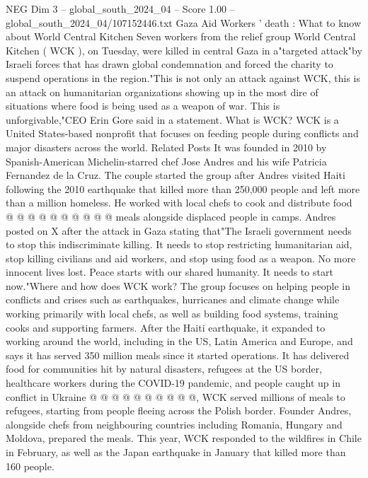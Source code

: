 \begin{textsample}{NEG Dim 3 – global\_south\_2024\_04 – Score 1.00 – global\_south\_2024\_04/107152446.txt}  \label{ex:f3_neg_266}
Gaza Aid Workers ' death : What to know about World Central Kitchen Seven workers from the relief group World Central Kitchen ( WCK ), on Tuesday, were killed in central Gaza in a"targeted attack"by Israeli forces that has drawn global condemnation and forced the charity to suspend operations in the region."This is not only an attack against WCK, this is an attack on humanitarian organizations showing up in the most dire of situations where food is being used as a weapon of war.
This is unforgivable,"CEO Erin Gore said in a statement.
What is WCK?
WCK is a United States-based nonprofit that focuses on feeding people during conflicts and major disasters across the world.
Related Posts It was founded in 2010 by Spanish-American Michelin-starred chef Jose Andres and his wife Patricia Fernandez de la Cruz.
The couple started the group after Andres visited Haiti following the 2010 earthquake that killed more than 250,000 people and left more than a million homeless.
He worked with local chefs to cook and distribute food @ @ @ @ @ @ @ @ @ @ meals alongside displaced people in camps.
Andres posted on X after the attack in Gaza stating that"The Israeli government needs to stop this indiscriminate killing.
It needs to stop restricting humanitarian aid, stop killing civilians and aid workers, and stop using food as a weapon.
No more innocent lives lost.
Peace starts with our shared humanity.
It needs to start now."Where and how does WCK work?
The group focuses on helping people in conflicts and crises such as earthquakes, hurricanes and climate change while working primarily with local chefs, as well as building food systems, training cooks and supporting farmers.
After the Haiti earthquake, it expanded to working around the world, including in the US, Latin America and Europe, and says it has served 350 million meals since it started operations.
It has delivered food for communities hit by natural disasters, refugees at the US border, healthcare workers during the COVID-19 pandemic, and people caught up in conflict in Ukraine @ @ @ @ @ @ @ @ @ @, WCK served millions of meals to refugees, starting from people fleeing across the Polish border.
Founder Andres, alongside chefs from neighbouring countries including Romania, Hungary and Moldova, prepared the meals.
This year, WCK responded to the wildfires in Chile in February, as well as the Japan earthquake in January that killed more than 160 people.

\end{textsample}

